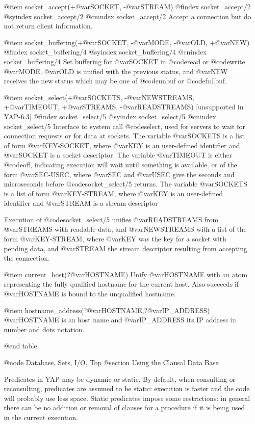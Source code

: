 {{{{{{@item socket_accept(+@var{SOCKET}, -@var{STREAM})
@findex socket_accept/2
@syindex socket_accept/2
@cnindex socket_accept/2
Accept a connection but do not return client information.

@item socket_buffering(+@var{SOCKET}, -@var{MODE}, -@var{OLD}, +@var{NEW})
@findex socket_buffering/4
@syindex socket_buffering/4
@cnindex socket_buffering/4
Set buffering for @var{SOCKET} in @code{read} or @code{write}
@var{MODE}. @var{OLD} is unified with the previous status, and @var{NEW}
receives the new status which may be one of @code{unbuf} or
@code{fullbuf}.

@item socket_select(+@var{SOCKETS}, -@var{NEWSTREAMS}, +@var{TIMEOUT},
+@var{STREAMS}, -@var{READSTREAMS}) [unsupported in YAP-6.3]
@findex socket_select/5
@syindex socket_select/5
@cnindex socket_select/5
Interface to system call @code{select}, used for servers to wait for
connection requests or for data at sockets. The variable
@var{SOCKETS} is a list of form @var{KEY-SOCKET}, where @var{KEY} is
an user-defined identifier and @var{SOCKET} is a socket descriptor. The
variable @var{TIMEOUT} is either @code{off}, indicating execution will
wait until something is available, or of the form @var{SEC-USEC}, where
@var{SEC} and @var{USEC} give the seconds and microseconds before
@code{socket_select/5} returns. The variable @var{SOCKETS} is a list of
form @var{KEY-STREAM}, where @var{KEY} is an user-defined identifier
and @var{STREAM} is a stream descriptor

Execution of @code{socket_select/5} unifies @var{READSTREAMS} from
@var{STREAMS} with readable data, and @var{NEWSTREAMS} with a list of
the form @var{KEY-STREAM}, where @var{KEY} was the key for a socket
with pending data, and @var{STREAM} the stream descriptor resulting
from accepting the connection.  

@item current_host(?@var{HOSTNAME})
Unify @var{HOSTNAME} with an atom representing the fully qualified
hostname for the current host. Also succeeds if @var{HOSTNAME} is bound
to the unqualified hostname.

@item hostname_address(?@var{HOSTNAME},?@var{IP_ADDRESS})
@var{HOSTNAME} is an host name and @var{IP_ADDRESS} its IP
address in number and dots notation.


@end table

@node Database, Sets, I/O, Top
@section Using the Clausal Data Base

Predicates in YAP may be dynamic or static. By default, when
consulting or reconsulting, predicates are assumed to be static:
execution is faster and the code will probably use less space.
Static predicates impose some restrictions: in general there can be no 
addition or removal of  clauses for a procedure if it is being used in the
current execution.

}}}}}}
